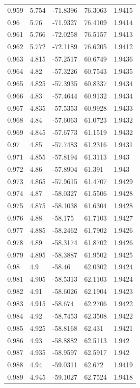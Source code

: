 \begin{tabular}{lllll}
0.959 & 5.754 & -71.8396 & 76.3063 & 1.9415 \\
0.96 & 5.76 & -71.9327 & 76.4109 & 1.9414 \\
0.961 & 5.766 & -72.0258 & 76.5157 & 1.9413 \\
0.962 & 5.772 & -72.1189 & 76.6205 & 1.9412 \\
0.963 & 4.815 & -57.2517 & 60.6749 & 1.9436 \\
0.964 & 4.82 & -57.3226 & 60.7543 & 1.9435 \\
0.965 & 4.825 & -57.3935 & 60.8337 & 1.9434 \\
0.966 & 4.83 & -57.4644 & 60.9132 & 1.9434 \\
0.967 & 4.835 & -57.5353 & 60.9928 & 1.9433 \\
0.968 & 4.84 & -57.6063 & 61.0723 & 1.9432 \\
0.969 & 4.845 & -57.6773 & 61.1519 & 1.9432 \\
0.97 & 4.85 & -57.7483 & 61.2316 & 1.9431 \\
0.971 & 4.855 & -57.8194 & 61.3113 & 1.943 \\
0.972 & 4.86 & -57.8904 & 61.391 & 1.943 \\
0.973 & 4.865 & -57.9615 & 61.4707 & 1.9429 \\
0.974 & 4.87 & -58.0327 & 61.5506 & 1.9428 \\
0.975 & 4.875 & -58.1038 & 61.6304 & 1.9428 \\
0.976 & 4.88 & -58.175 & 61.7103 & 1.9427 \\
0.977 & 4.885 & -58.2462 & 61.7902 & 1.9426 \\
0.978 & 4.89 & -58.3174 & 61.8702 & 1.9426 \\
0.979 & 4.895 & -58.3887 & 61.9502 & 1.9425 \\
0.98 & 4.9 & -58.46 & 62.0302 & 1.9424 \\
0.981 & 4.905 & -58.5313 & 62.1103 & 1.9424 \\
0.982 & 4.91 & -58.6026 & 62.1904 & 1.9423 \\
0.983 & 4.915 & -58.674 & 62.2706 & 1.9422 \\
0.984 & 4.92 & -58.7453 & 62.3508 & 1.9422 \\
0.985 & 4.925 & -58.8168 & 62.431 & 1.9421 \\
0.986 & 4.93 & -58.8882 & 62.5113 & 1.942 \\
0.987 & 4.935 & -58.9597 & 62.5917 & 1.942 \\
0.988 & 4.94 & -59.0311 & 62.672 & 1.9419 \\
0.989 & 4.945 & -59.1027 & 62.7524 & 1.9418 \\

\end{tabular}
